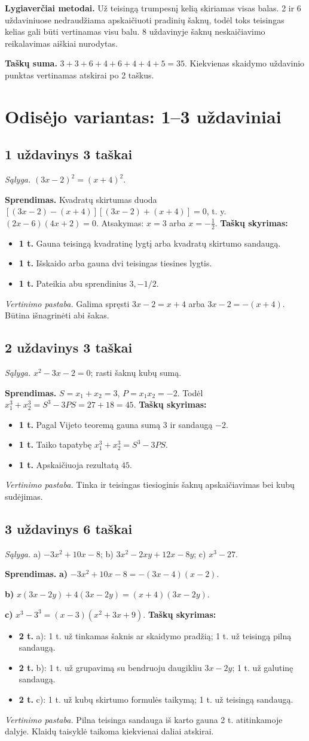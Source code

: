 \documentclass[11pt,a4paper]{article}
\newcommand{\uzd}[3]{\subsection*{#1 uždavinys \hfill #2 taškai}\textit{Sąlyga.} #3\par}
\newcommand{\kriterijai}{\textbf{Taškų skyrimas:}}
\newcommand{\balas}[2]{\item \textbf{#1 t.} #2}
\begin{document}
\textbf{Lygiaverčiai metodai.} Už teisingą trumpesnį kelią skiriamas visas balas. 2 ir 6 uždaviniuose nedraudžiama apskaičiuoti pradinių šaknų, todėl toks teisingas kelias gali būti vertinamas visu balu. 8 uždavinyje šaknų neskaičiavimo reikalavimas aiškiai nurodytas.

\textbf{Taškų suma.} $3+3+6+4+6+4+4+5=35$. Kiekvienas skaidymo uždavinio punktas vertinamas atskirai po 2 taškus.

\newpage
\section*{Odisėjo variantas: 1--3 uždaviniai}
\uzd{1}{3}{$(3x-2)^2=(x+4)^2$.}
\textbf{Sprendimas.} Kvadratų skirtumas duoda $[(3x-2)-(x+4)][(3x-2)+(x+4)]=0$, t. y. $(2x-6)(4x+2)=0$. Atsakymas: $x=3$ arba $x=-\frac12$.
\kriterijai\begin{itemize}
\balas{1}{Gauna teisingą kvadratinę lygtį arba kvadratų skirtumo sandaugą.}
\balas{1}{Išskaido arba gauna dvi teisingas tiesines lygtis.}
\balas{1}{Pateikia abu sprendinius $3,-1/2$.}
\end{itemize}
\textit{Vertinimo pastaba.} Galima spręsti $3x-2=x+4$ arba $3x-2=-(x+4)$. Būtina išnagrinėti abi šakas.
\uzd{2}{3}{$x^2-3x-2=0$; rasti šaknų kubų sumą.}
\textbf{Sprendimas.} $S=x_1+x_2=3$, $P=x_1x_2=-2$. Todėl $x_1^3+x_2^3=S^3-3PS=27+18=45$.
\kriterijai\begin{itemize}
\balas{1}{Pagal Vijeto teoremą gauna sumą $3$ ir sandaugą $-2$.}
\balas{1}{Taiko tapatybę $x_1^3+x_2^3=S^3-3PS$.}
\balas{1}{Apskaičiuoja rezultatą $45$.}
\end{itemize}
\textit{Vertinimo pastaba.} Tinka ir teisingas tiesioginis šaknų apskaičiavimas bei kubų sudėjimas.
\uzd{3}{6}{a) $-3x^2+10x-8$; b) $3x^2-2xy+12x-8y$; c) $x^3-27$.}
\textbf{Sprendimas.} \textbf{a)} $-3x^2+10x-8=-(3x-4)(x-2)$.\par\textbf{b)} $x(3x-2y)+4(3x-2y)=(x+4)(3x-2y)$.\par\textbf{c)} $x^3-3^3=(x-3)(x^2+3x+9)$.
\kriterijai\begin{itemize}
\balas{2}{a): 1 t. už tinkamas šaknis ar skaidymo pradžią; 1 t. už teisingą pilną sandaugą.}
\balas{2}{b): 1 t. už grupavimą su bendruoju daugikliu $3x-2y$; 1 t. už galutinę sandaugą.}
\balas{2}{c): 1 t. už kubų skirtumo formulės taikymą; 1 t. už teisingą sandaugą.}
\end{itemize}
\textit{Vertinimo pastaba.} Pilna teisinga sandauga iš karto gauna 2 t. atitinkamoje dalyje. Klaidų taisyklė taikoma kiekvienai daliai atskirai.
\newpage
\end{document}
